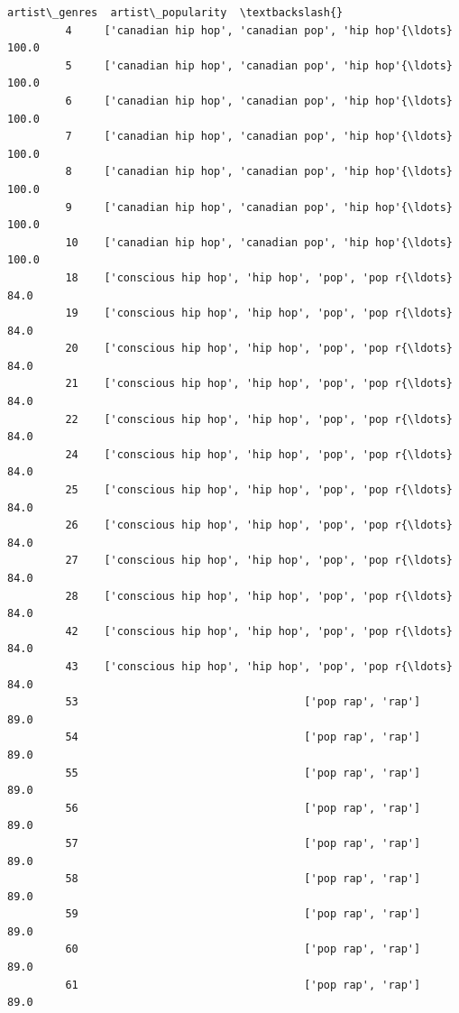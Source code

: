 \documentclass[11pt]{article}
\begin{document}
\begin{Verbatim}[commandchars=\\\{\}]
                                                   artist\_genres  artist\_popularity  \textbackslash{}
         4     ['canadian hip hop', 'canadian pop', 'hip hop'{\ldots}              100.0   
         5     ['canadian hip hop', 'canadian pop', 'hip hop'{\ldots}              100.0   
         6     ['canadian hip hop', 'canadian pop', 'hip hop'{\ldots}              100.0   
         7     ['canadian hip hop', 'canadian pop', 'hip hop'{\ldots}              100.0   
         8     ['canadian hip hop', 'canadian pop', 'hip hop'{\ldots}              100.0   
         9     ['canadian hip hop', 'canadian pop', 'hip hop'{\ldots}              100.0   
         10    ['canadian hip hop', 'canadian pop', 'hip hop'{\ldots}              100.0   
         18    ['conscious hip hop', 'hip hop', 'pop', 'pop r{\ldots}               84.0   
         19    ['conscious hip hop', 'hip hop', 'pop', 'pop r{\ldots}               84.0   
         20    ['conscious hip hop', 'hip hop', 'pop', 'pop r{\ldots}               84.0   
         21    ['conscious hip hop', 'hip hop', 'pop', 'pop r{\ldots}               84.0   
         22    ['conscious hip hop', 'hip hop', 'pop', 'pop r{\ldots}               84.0   
         24    ['conscious hip hop', 'hip hop', 'pop', 'pop r{\ldots}               84.0   
         25    ['conscious hip hop', 'hip hop', 'pop', 'pop r{\ldots}               84.0   
         26    ['conscious hip hop', 'hip hop', 'pop', 'pop r{\ldots}               84.0   
         27    ['conscious hip hop', 'hip hop', 'pop', 'pop r{\ldots}               84.0   
         28    ['conscious hip hop', 'hip hop', 'pop', 'pop r{\ldots}               84.0   
         42    ['conscious hip hop', 'hip hop', 'pop', 'pop r{\ldots}               84.0   
         43    ['conscious hip hop', 'hip hop', 'pop', 'pop r{\ldots}               84.0   
         53                                   ['pop rap', 'rap']               89.0   
         54                                   ['pop rap', 'rap']               89.0   
         55                                   ['pop rap', 'rap']               89.0   
         56                                   ['pop rap', 'rap']               89.0   
         57                                   ['pop rap', 'rap']               89.0   
         58                                   ['pop rap', 'rap']               89.0   
         59                                   ['pop rap', 'rap']               89.0   
         60                                   ['pop rap', 'rap']               89.0   
         61                                   ['pop rap', 'rap']               89.0   

\end{Verbatim}
\end{document}
